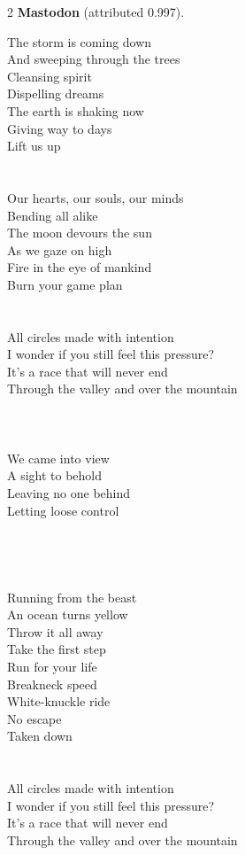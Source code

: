 \begin{multicols}{2}
\nopagebreak\noindent\textbf{Mastodon} (attributed 0.997).\par\nopagebreak\vspace{4pt}
{\footnotesize\itshape\raggedright
The storm is coming down \\
And sweeping through the trees \\
Cleansing spirit \\
Dispelling dreams \\
The earth is shaking now \\
Giving way to days \\
Lift us up \\
\mbox{} \\
\mbox{} \\
Our hearts, our souls, our minds \\
Bending all alike \\
The moon devours the sun \\
As we gaze on high \\
Fire in the eye of mankind \\
Burn your game plan \\
\mbox{} \\
\mbox{} \\
All circles made with intention \\
I wonder if you still feel this pressure? \\
It's a race that will never end \\
Through the valley and over the mountain \\
\mbox{} \\
\mbox{} \\
\mbox{} \\
We came into view \\
A sight to behold \\
Leaving no one behind \\
Letting loose control \\
\mbox{} \\
\mbox{} \\
\mbox{} \\
\mbox{} \\
Running from the beast \\
An ocean turns yellow \\
Throw it all away \\
Take the first step \\
Run for your life \\
Breakneck speed \\
White-knuckle ride \\
No escape \\
Taken down \\
\mbox{} \\
\mbox{} \\
All circles made with intention \\
I wonder if you still feel this pressure? \\
It's a race that will never end \\
Through the valley and over the mountain\par}
\medskip


\end{multicols}
